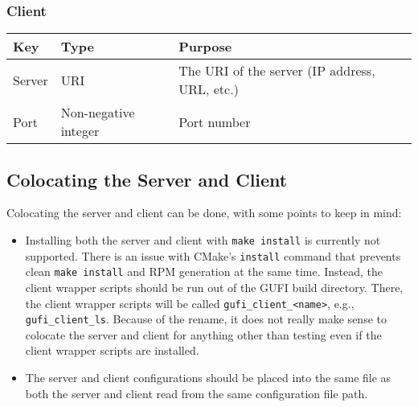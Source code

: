 \subsubsection{Client}
\begin{tabular}{| l | l | l |}
  \hline
  Key & Type & Purpose \\
  \hline
  Server & URI & The URI of the server (IP address, URL, etc.) \\
  \hline
  Port & Non-negative integer & Port number \\
  \hline
\end{tabular}

\subsection{Colocating the Server and Client}
Colocating the server and client can be done, with some points to keep
in mind:

\begin{itemize}
  \item Installing both the server and client with
    \texttt{make~install} is currently not supported. There is an
    issue with CMake's \texttt{install} command that prevents clean
    \texttt{make~install} and RPM generation at the same
    time. Instead, the client wrapper scripts should be run out of the
    GUFI build directory. There, the client wrapper scripts will be
    called \texttt{gufi\_client\_<name>}, e.g.,
    \texttt{gufi\_client\_ls}. Because of the rename, it does not
    really make sense to colocate the server and client for anything
    other than testing even if the client wrapper scripts are
    installed.
  \item The server and client configurations should be placed into the
    same file as both the server and client read from the same
    configuration file path.
\end{itemize}
